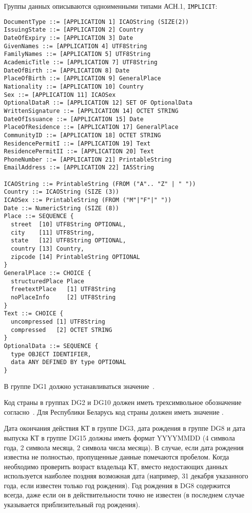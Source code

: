 Группы данных описываются одноименными типами АСН.1,
 \verb|IMPLICIT|:

\begin{verbatim}
DocumentType ::= [APPLICATION 1] ICAOString (SIZE(2))
IssuingState ::= [APPLICATION 2] Country
DateOfExpiry ::= [APPLICATION 3] Date
GivenNames ::= [APPLICATION 4] UTF8String
FamilyNames ::= [APPLICATION 5] UTF8String
AcademicTitle ::= [APPLICATION 7] UTF8String
DateOfBirth ::= [APPLICATION 8] Date
PlaceOfBirth ::= [APPLICATION 9] GeneralPlace
Nationality ::= [APPLICATION 10] Country
Sex ::= [APPLICATION 11] ICAOSex
OptionalDataR ::= [APPLICATION 12] SET OF OptionalData
WrittenSignature ::= [APPLICATION 14] OCTET STRING
DateOfIssuance ::= [APPLICATION 15] Date
PlaceOfResidence ::= [APPLICATION 17] GeneralPlace
CommunityID ::= [APPLICATION 18] OCTET STRING
ResidencePermitI ::= [APPLICATION 19] Text
ResidencePermitII ::= [APPLICATION 20] Text
PhoneNumber ::= [APPLICATION 21] PrintableString
EmailAddress ::= [APPLICATION 22] IA5String

ICAOString ::= PrintableString (FROM ("A".. "Z" | " "))
Country ::= ICAOString (SIZE (3))
ICAOSex ::= PrintableString (FROM ("M"|"F"|" "))
Date ::= NumericString (SIZE (8))
Place ::= SEQUENCE {
  street  [10] UTF8String OPTIONAL,
  city    [11] UTF8String,
  state   [12] UTF8String OPTIONAL,
  country [13] Country,
  zipcode [14] PrintableString OPTIONAL
}
GeneralPlace ::= CHOICE {
  structuredPlace Place
  freetextPlace   [1] UTF8String
  noPlaceInfo     [2] UTF8String
}
Text ::= CHOICE {
  uncompressed [1] UTF8String
  compressed   [2] OCTET STRING
}
OptionalData ::= SEQUENCE {
  type OBJECT IDENTIFIER,
  data ANY DEFINED BY type OPTIONAL
}
\end{verbatim}

В группе DG1 должно устанавливаться значение~.

Код страны в группах DG2 и DG10 должен иметь трехсимвольное обозначение 
согласно~\cite{CountryCodes}. 
Для Республики Беларусь код страны должен иметь значение . 

Дата окончания действия КТ в группе DG3, дата рождения в группе DG8 
и дата выпуска КТ в группе DG15 должны иметь формат YYYYMMDD 
(4 символа года, 2 символа месяца, 2 символа 
числа месяца). В случае, если дата рождения известна не полностью, 
пропущенные данные помечаются пробелом. Когда необходимо проверить 
возраст владельца КТ, вместо недостающих данных используется наиболее 
поздняя возможная дата (например, 31 декабря указанного года, если 
известен только год рождения). Год рождения в DG8 содержится всегда, даже 
если он в действительности точно не известен (в последнем случае 
указывается приблизительный год рождения). 

